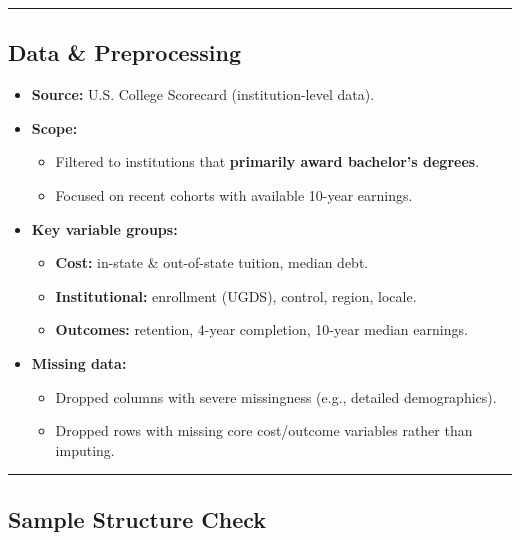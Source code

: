 \documentclass[
  letterpaper,
  DIV=11,
  numbers=noendperiod]{scrartcl}
\providecommand{\tightlist}{%
  \setlength{\itemsep}{0pt}\setlength{\parskip}{0pt}}
\begin{document}
\begin{center}\rule{0.5\linewidth}{0.5pt}\end{center}

\subsection{Data \& Preprocessing}\label{data-preprocessing}

\begin{itemize}
\tightlist
\item
  \textbf{Source:} U.S. College Scorecard (institution-level data).
\item
  \textbf{Scope:}

  \begin{itemize}
  \tightlist
  \item
    Filtered to institutions that \textbf{primarily award bachelor's
    degrees}.
  \item
    Focused on recent cohorts with available 10-year earnings.
  \end{itemize}
\item
  \textbf{Key variable groups:}

  \begin{itemize}
  \tightlist
  \item
    \textbf{Cost:} in-state \& out-of-state tuition, median debt.
  \item
    \textbf{Institutional:} enrollment (UGDS), control, region, locale.
  \item
    \textbf{Outcomes:} retention, 4-year completion, 10-year median
    earnings.
  \end{itemize}
\item
  \textbf{Missing data:}

  \begin{itemize}
  \tightlist
  \item
    Dropped columns with severe missingness (e.g., detailed
    demographics).
  \item
    Dropped rows with missing core cost/outcome variables rather than
    imputing.
  \end{itemize}
\end{itemize}

\begin{center}\rule{0.5\linewidth}{0.5pt}\end{center}

\subsection{Sample Structure Check}\label{sample-structure-check}
\end{document}
